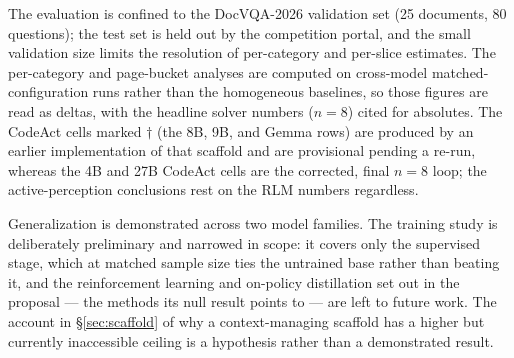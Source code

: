 The evaluation is confined to the DocVQA-2026 validation set (25 documents, 80 questions); the test set is held out by the competition portal, and the small validation size limits the resolution of per-category and per-slice estimates. The per-category and page-bucket analyses are computed on cross-model matched-configuration runs rather than the homogeneous baselines, so those figures are read as deltas, with the headline solver numbers ($n{=}8$) cited for absolutes. The CodeAct cells marked $\dag$ (the 8B, 9B, and Gemma rows) are produced by an earlier implementation of that scaffold and are provisional pending a re-run, whereas the 4B and 27B CodeAct cells are the corrected, final $n{=}8$ loop; the active-perception conclusions rest on the RLM numbers regardless.

Generalization is demonstrated across two model families. The training study is deliberately preliminary and narrowed in scope: it covers only the supervised stage, which at matched sample size ties the untrained base rather than beating it, and the reinforcement learning and on-policy distillation set out in the proposal --- the methods its null result points to --- are left to future work. The account in \S\ref{sec:scaffold} of why a context-managing scaffold has a higher but currently inaccessible ceiling is a hypothesis rather than a demonstrated result.
